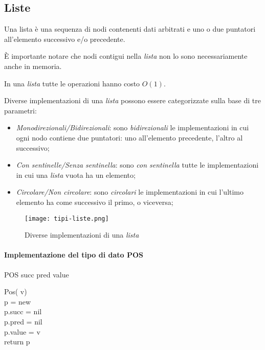 \subsection{Liste}
\begin{definition}[Lista]
    Una lista è una sequenza di nodi contenenti dati arbitrati e uno o due
    puntatori all'elemento successivo e/o precedente.
\end{definition}
\begin{note}
    È importante notare che nodi contigui nella \emph{lista} non lo sono
    necessariamente anche in memoria.
\end{note}
\begin{note}
    In una \emph{lista} tutte le operazioni hanno costo $O(1)$.
\end{note}\noindent
Diverse implementazioni di una \emph{lista} possono essere categorizzate sulla
base di tre parametri:
\begin{itemize}
    \item \emph{Monodirezionali/Bidirezionali}: sono \emph{bidirezionali} le
    implementazioni in cui ogni nodo contiene due puntatori: uno all'elemento
    precedente, l'altro al successivo;
    \item \emph{Con sentinelle/Senza sentinella}: sono \emph{con sentinella}
    tutte le implementazioni in cui una \emph{lista} vuota ha un elemento;
    \item \emph{Circolare/Non circolare}: sono \emph{circolari} le
    implementazioni in cui l'ultimo elemento ha come successivo il primo, o
    viceversa;
\end{itemize}

\begin{figure}[ht]
    \centering
    \texttt{[image: tipi-liste.png]}
    \caption{Diverse implementazioni di una \emph{lista}}
\end{figure}

\paragraph{Implementazione del tipo di dato POS}
\begin{code}{POS}
     succ\hfill{}
     pred\hfill{}
     value\hfill{}
    
    \ind{} Pos( v)\\
         p = new \\
        p.succ = nil\\
        p.pred = nil\\
        p.value = v\\
        return p
\end{code}

